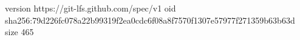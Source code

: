 version https://git-lfs.github.com/spec/v1
oid sha256:79d226fc078a22b99319f2ea0cdc6f08a8f7570f1307e57977f271359b63b63d
size 465
